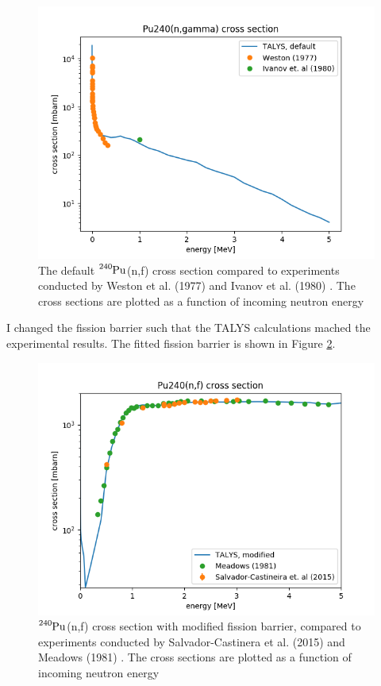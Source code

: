 \documentclass[]{article}
\begin{document}
  \begin{figure} [H]
	\centering
	\includegraphics[scale=0.7]{Default_TALYS_gamma_xs_vs_exp.png}
	\caption{The default $\ce{^{240}Pu}$(n,f) cross section compared to experiments conducted by Weston et al. (1977) \cite{Weston1977} and Ivanov et al. (1980) \cite{Ivanov1980}. The cross sections are plotted as a function of incoming neutron energy }
	\label{fig:Default_TALYS_gamma_xs_vs_exp}
\end{figure}

 \noindent I changed the fission barrier such that the TALYS calculations mached the experimental results. The fitted fission barrier is shown in Figure \ref{fig:Modified_TALYS_gamma_xs_vs_exp}.

  \begin{figure} [H]
	\centering
	\includegraphics[scale=0.7]{Modified_TALYS_fission_xs_vs_exp.png}
	\caption{ $\ce{^{240}Pu}$(n,f) cross section with modified fission barrier, compared to experiments conducted by Salvador-Castinera et al. (2015) \cite{SALVADORCASTINEIRA2015177} and Meadows (1981) \cite{Meadows198}. The cross sections are plotted as a function of incoming neutron energy}
	\label{fig:Modified_TALYS_gamma_xs_vs_exp}
\end{figure}
\end{document}
